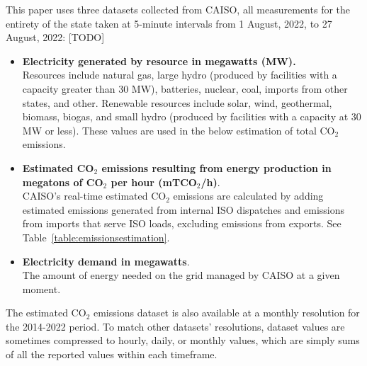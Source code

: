 \documentclass{article}
\begin{document}
This paper uses three datasets collected from CAISO, all measurements for the entirety of the state taken at 5-minute intervals from 1 August, 2022, to 27 August, 2022: [TODO] \citep{caiso:energyemissionsdata}

\begin{itemize}
    \item 
    \textbf{Electricity generated by resource in megawatts (MW).}\\
    Resources include natural gas, large hydro (produced by facilities with a capacity greater than 30 MW), batteries, nuclear, coal, imports from other states, and other. Renewable resources include solar, wind, geothermal, biomass, biogas, and small hydro (produced by facilities with a capacity at 30 MW or less). These values are used in the below estimation of total CO\(_2\) emissions.
    
    \item
    \textbf{Estimated CO\(_2\) emissions resulting from energy production in megatons of CO\(_2\) per hour (mTCO\(_2\)/h)}.\\
    CAISO's real-time estimated CO\(_2\) emissions are calculated by adding estimated emissions generated from internal ISO dispatches and emissions from imports that serve ISO loads, excluding emissions from exports. \citep{caiso:ghgmethod} See Table~\ref{table:emissionsestimation}.
   
    \item
    \textbf{Electricity demand in megawatts}.\\
    The amount of energy needed on the grid managed by CAISO at a given moment.
\end{itemize}

The estimated CO\(_2\) emissions dataset is also available at a monthly resolution for the 2014-2022 period. To match other datasets' resolutions, dataset values are sometimes compressed to hourly, daily, or monthly values, which are simply sums of all the reported values within each timeframe.
\end{document}
